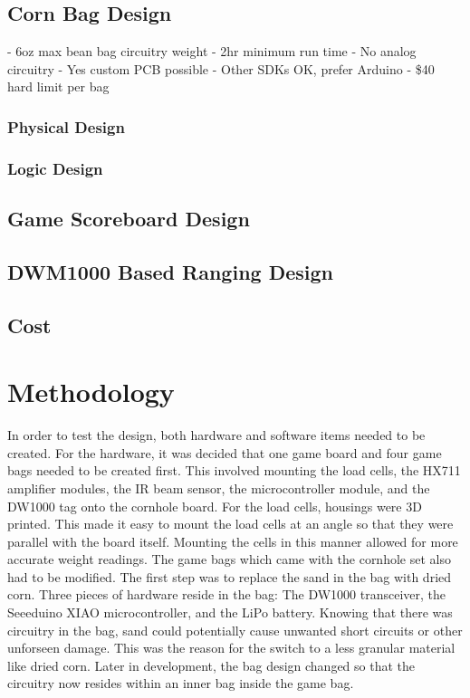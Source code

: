\documentclass{article}
\begin{document}
\subsection{Corn Bag Design}
- 6oz max bean bag circuitry weight
- 2hr minimum run time
- No analog circuitry
- Yes custom PCB possible
- Other SDKs OK, prefer Arduino
- \$40 hard limit per bag

\subsubsection{Physical Design}
\subsubsection{Logic Design}
\subsection{Game Scoreboard Design}
\subsection{DWM1000 Based Ranging Design}
\subsection{Cost}
\section{Methodology}
In order to test the design, both hardware and software items needed to be created. For the hardware, it was decided that one game board and four game bags needed to be created first. This involved mounting the load cells, the HX711 amplifier modules, the IR beam sensor, the microcontroller module, and the DW1000 tag onto the cornhole board. For the load cells, housings were 3D printed. This made it easy to mount the load cells at an angle so that they were parallel with the board itself. Mounting the cells in this manner allowed for more accurate weight readings. The game bags which came with the cornhole set also had to be modified. The first step was to replace the sand in the bag with dried corn. Three pieces of hardware reside in the bag: The DW1000 transceiver, the Seeeduino XIAO microcontroller, and the LiPo battery. Knowing that there was circuitry in the bag, sand could potentially cause unwanted short circuits or other unforseen damage. This was the reason for the switch to a less granular material like dried corn. Later in development, the bag design changed so that the circuitry now resides within an inner bag inside the game bag.  
\end{document}
